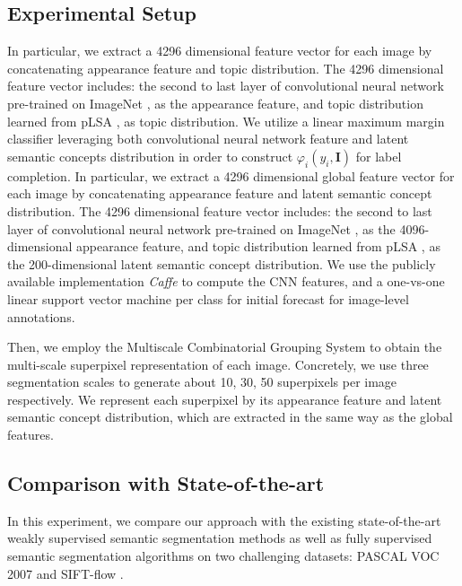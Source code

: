 \subsection{Experimental Setup}
\if
In particular, we extract a 4296 dimensional feature vector for each image by concatenating appearance feature and topic distribution. The 4296 dimensional feature vector includes: the second to last layer of convolutional neural network \cite{simonyan2014very} pre-trained on ImageNet \cite{russakovsky2014imagenet}, as the appearance feature, and topic distribution learned from pLSA \cite{hofmann1999probabilistic}, as topic distribution.
\fi
We utilize a linear maximum margin classifier leveraging both convolutional neural network feature and latent semantic concepts distribution in order to construct $\varphi_{i}(y_i,\boldsymbol{I})$ for label completion. In particular, we extract a 4296 dimensional global feature vector for each image by concatenating appearance feature and latent semantic concept distribution. The 4296 dimensional feature vector includes: the second to last layer of convolutional neural network \cite{simonyan2014very} pre-trained on ImageNet \cite{russakovsky2014imagenet}, as the 4096-dimensional appearance feature, and topic distribution learned from pLSA \cite{hofmann1999probabilistic}, as the 200-dimensional latent semantic concept distribution. We use the publicly available implementation \emph{Caffe} \cite{jia2014caffe} to compute the CNN features, and a one-vs-one linear support vector machine \cite{fan2008liblinear} per class for initial forecast for image-level annotations.

Then, we employ the Multiscale Combinatorial Grouping System \cite{arbelaez2014multiscale} to obtain the multi-scale superpixel representation of each image. Concretely, we use three segmentation scales to generate about 10, 30, 50 superpixels per image respectively. We represent each superpixel by its appearance feature and latent semantic concept distribution, which are extracted in the same way as the global features.

\subsection{Comparison with State-of-the-art}
In this experiment, we compare our approach with the existing state-of-the-art weakly supervised semantic segmentation methods as well as fully supervised semantic segmentation algorithms on two challenging datasets: PASCAL VOC 2007 \cite{pascal-voc-2007} and SIFT-flow \cite{liu2011nonparametric}.

